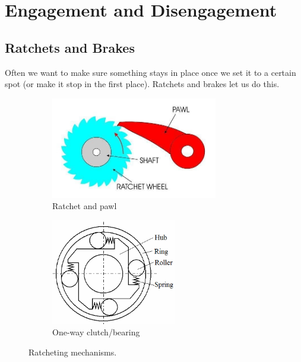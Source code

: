 \documentclass[10pt,letterpaper]{book}
\begin{document}
\newpage
\section{Engagement and Disengagement} \label{section:disengagement}

\subsection{Ratchets and Brakes}

Often we want to make sure something stays in place once we set it to a certain spot (or make it stop in the first place). Ratchets and brakes let us do this.

\begin{figure}[H]
	\begin{subfigure}[b]{.4\linewidth}
		\includegraphics[width=0.8\textwidth]{imgs/ratchet.jpeg}
		\caption{Ratchet and pawl}
	\end{subfigure}\begin{subfigure}[b]{.4\linewidth}
		\includegraphics[width=0.6\textwidth]{imgs/oneway_clutch.png}
		\caption{One-way clutch/bearing}
	\end{subfigure}
	\caption{Ratcheting mechanisms.}
\end{figure}
\end{document}
